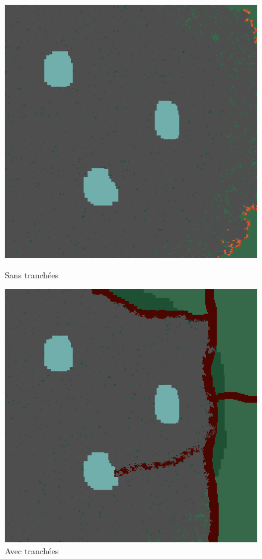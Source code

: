 \documentclass[12pt]{article}
\begin{document}
\begin{figure}[!ht]
    \centering
    \begin{minipage}{0.35\textwidth}
      \centering
      \includegraphics[width=.8\linewidth]{pictures/trans/no_treach.png}
      \caption{Sans tranchées}\label{Fig:Data5}
    \end{minipage}
    \hfil
    \begin{minipage}{0.35\textwidth}
      \centering
      \includegraphics[width=.8\linewidth]{pictures/trans/treach.png}
      \caption{Avec tranchées}\label{Fig:Data6}
    \end{minipage}
\end{figure}
\end{document}
